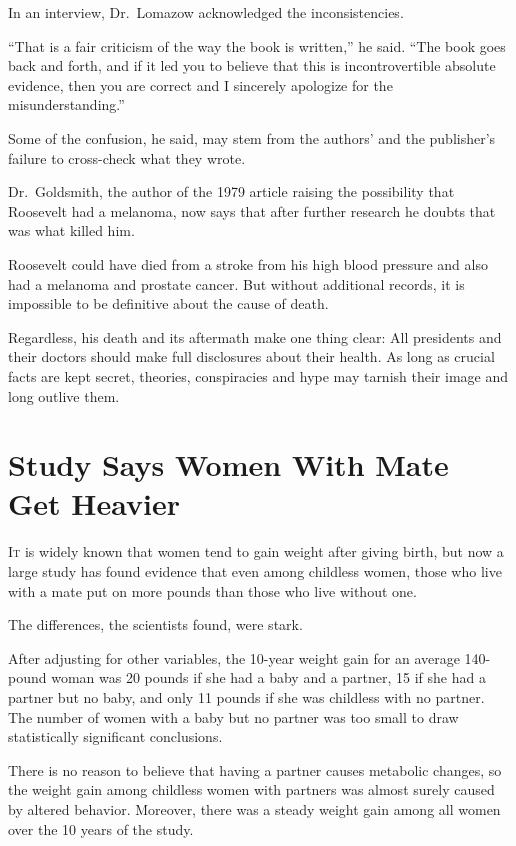 ﻿\documentclass[12pt]{article}
\begin{document}
In an interview, Dr.~Lomazow acknowledged the inconsistencies.

``That is a fair criticism of the way the book is written,'' he said. ``The book goes back and
forth, and if it led you to believe that this is incontrovertible absolute evidence, then you are
correct and I sincerely apologize for the misunderstanding.''

Some of the confusion, he said, may stem from the authors' and the publisher's failure to
cross-check what they wrote.

Dr.~Goldsmith, the author of the 1979 article raising the possibility that Roosevelt had a melanoma,
now says that after further research he doubts that was what killed him.

Roosevelt could have died from a stroke from his high blood pressure and also had a melanoma and
prostate cancer. But without additional records, it is impossible to be definitive about the cause
of death.

Regardless, his death and its aftermath make one thing clear: All presidents and their doctors
should make full disclosures about their health. As long as crucial facts are kept secret, theories,
conspiracies and hype may tarnish their image and long outlive them.

\section{Study Says Women With Mate Get Heavier}

\lettrine{I}{t} is widely known that women tend to gain weight after giving
birth, but now a large study has found evidence that even among childless women, those who live with
a mate put on more pounds than those who live without one.

The differences, the scientists found, were stark.

After adjusting for other variables, the 10-year weight gain for an average 140-pound woman was 20
pounds if she had a baby and a partner, 15 if she had a partner but no baby, and only 11 pounds if
she was childless with no partner. The number of women with a baby but no partner was too small to
draw statistically significant conclusions.

There is no reason to believe that having a partner causes metabolic changes, so the weight gain
among childless women with partners was almost surely caused by altered behavior. Moreover, there
was a steady weight gain among all women over the 10 years of the study.
\end{document}
